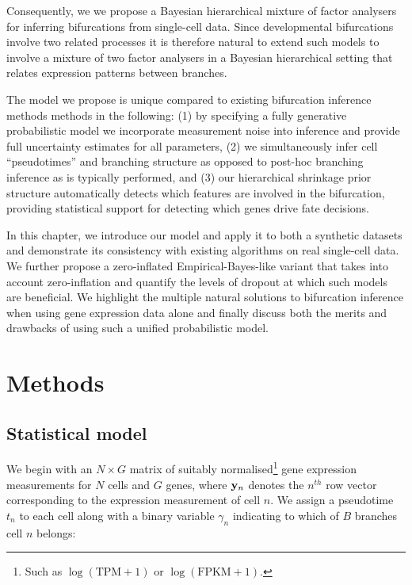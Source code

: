Consequently, we we propose a Bayesian hierarchical mixture of factor analysers for inferring bifurcations from single-cell data.
Since developmental bifurcations involve two related processes it is therefore natural to extend such models to involve a mixture of two factor analysers in a Bayesian hierarchical setting that relates expression patterns between branches.

The model we propose is unique compared to existing bifurcation inference methods methods in the following: (1) by specifying a fully generative probabilistic model we incorporate measurement noise into inference and provide full uncertainty estimates for all parameters, (2) we simultaneously infer cell ``pseudotimes'' and branching structure as opposed to post-hoc branching inference as is typically performed, and (3) our hierarchical shrinkage prior structure automatically detects which features are involved in the bifurcation, providing statistical support for detecting which genes drive fate decisions.

In this chapter, we introduce our model and apply it to both a synthetic datasets and demonstrate its consistency with existing algorithms on real single-cell data. We further propose a zero-inflated Empirical-Bayes-like variant that takes into account zero-inflation and quantify the levels of dropout at which such models are beneficial.  We highlight the multiple natural solutions to bifurcation inference when using gene expression data alone and finally discuss both the merits and drawbacks of using such a unified probabilistic model.


\section{Methods}

\subsection{Statistical model}

We begin with an $N \times G$ matrix of suitably normalised\footnote{Such as $\log(\text{TPM} + 1)$ or $\log(\text{FPKM} + 1)$.} gene expression measurements for $N$ cells and $G$ genes, where ${\bf y}_n$ denotes the $n^{th}$ row vector corresponding to the expression measurement of cell $n$. We assign a pseudotime $t_n$ to each cell along with a binary variable $\gamma_n$ indicating to which of $B$ branches cell $n$ belongs:

